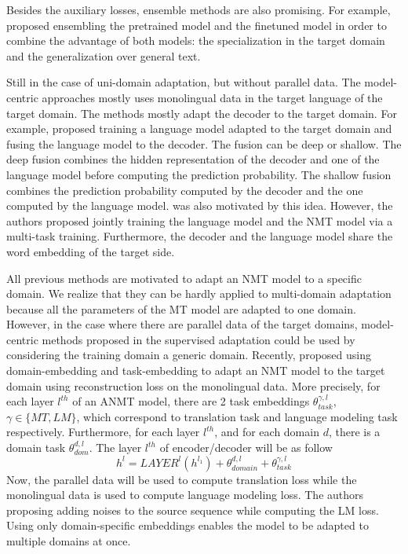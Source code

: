 Besides the auxiliary losses, ensemble methods are also promising. For example, \citet{Freitag16fast} proposed ensembling the pretrained model and the finetuned model in order to combine the advantage of both models: the specialization in the target domain and the generalization over general text.

Still in the case of uni-domain adaptation, but without parallel data. The model-centric approaches mostly uses monolingual data in the target language of the target domain. The methods mostly adapt the decoder to the target domain. For example, \citet{Gulcehre16monolingual} proposed training a language model adapted to the target domain and fusing the language model to the decoder. The fusion can be deep or shallow. The deep fusion combines the hidden representation of the decoder and one of the language model before computing the prediction probability. The shallow fusion combines the prediction probability computed by the decoder and the one computed by the language model. \citet{Domhan2017using} was also motivated by this idea. However, the authors proposed jointly training the language model and the NMT model via a multi-task training. Furthermore, the decoder and the language model share the word embedding of the target side.

All previous methods are motivated to adapt an NMT model to a specific domain. We realize that they can be hardly applied to multi-domain adaptation because all the parameters of the MT model are adapted to one domain. However, in the case where there are parallel data of the target domains, model-centric methods proposed in the supervised adaptation could be used by considering the training domain a generic domain. Recently, \cite{Dou19unsupervised} proposed using domain-embedding and task-embedding to adapt an NMT model to the target domain using reconstruction loss on the monolingual data. More precisely, for each layer $l^{th}$ of an ANMT model, there are 2 task embeddings $\theta_{task}^{\gamma,l}$, $\gamma \in \{ MT, LM \}$, which correspond to translation task and language modeling task respectively. Furthermore, for each layer $l^{th}$, and for each domain $d$, there is a domain task $\theta^{d,l}_{dom}$. The layer $l^{th}$ of encoder/decoder will be as follow
\begin{equation}
h^{l} = LAYER^l(h^{l_1}) + \theta^{d,l}_{domain} + \theta_{task}^{\gamma,l}
\end{equation}
Now, the parallel data will be used to compute translation loss while the monolingual data is used to compute language modeling loss. The authors proposing adding noises to the source sequence while computing the LM loss. Using only domain-specific embeddings enables the model to be adapted to multiple domains at once.


